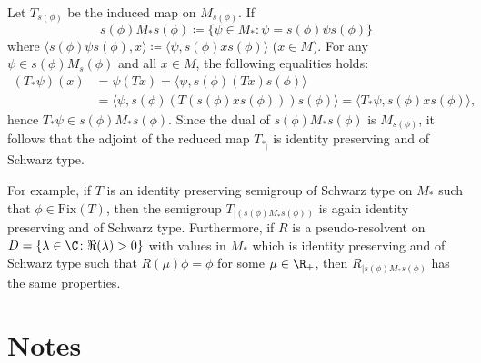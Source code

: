 Let $ T_{s(\phi)} $ be the induced map on $ M_{s(\phi)} $. 
If
\[
s(\phi)M_{*}s(\phi) \coloneqq \{\psi \in M_{*} \colon \psi = s(\phi)\psi s(\phi)\}
\]
where $ \langle s(\phi)\psi s(\phi),x \rangle \coloneqq \langle \psi,s(\phi)xs(\phi) \rangle $ ($ x \in M $).
For any $\psi \in s(\phi)M_s(\phi)$ and all $x \in M$, the following equalities holds:
\begin{align*}
(T_{*}\psi)(x) &= \psi(Tx) = \langle \psi,s(\phi)(Tx)s(\phi) \rangle \\
	&= \langle \psi,s(\phi)(T(s(\phi)xs(\phi)))s(\phi) \rangle = \langle T_{*}\psi,s(\phi)xs(\phi) \rangle,
\end{align*}
hence $ T_{*}\psi \in s(\phi)M_{*}s(\phi) $.
Since the dual of $ s(\phi)M_{*}s(\phi) $ is $ M_{s(\phi)} $, it follows that the adjoint of the reduced map $ T_{*_{|}} $ is identity preserving and of Schwarz type.

For example, if $ T $ is an identity preserving semigroup of Schwarz type on $ M_{*} $ such that $ \phi \in \text{Fix}(T) $, then the semigroup $ T_{\vert (s(\phi)M_{*}s(\phi))} $ is again identity preserving and of Schwarz type.
Furthermore, if $ R $ is a pseudo-resolvent on $ D = \{\lambda \in \C \colon \Re(\lambda) > 0\} $ with values in $ M_{*} $ which is identity preserving and of Schwarz type such that $ R(\mu)\phi = \phi $ for some $ \mu \in \R_{+} $, then $ R_{\vert s(\phi)M_{*}s(\phi)} $ has the same properties.

\section*{Notes}


